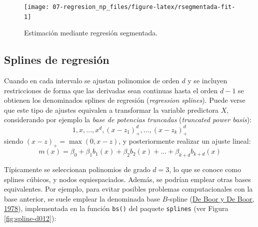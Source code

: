 \documentclass[
]{book}
\theoremstyle{break}
\theoremstyle{nonumberplain}
\begin{document}
\begin{figure}[!htb]

{\centering \texttt{[image: 07-regresion\_np\_files/figure-latex/rsegmentada-fit-1]} 

}

\caption{Estimación mediante regresión segmentada.}\label{fig:rsegmentada-fit}
\end{figure}

\hypertarget{reg-splines}{%
\subsection{Splines de regresión}\label{reg-splines}}

Cuando en cada intervalo se ajustan polinomios de orden \(d\) y se incluyen restricciones de forma que las derivadas sean continuas hasta el orden \(d-1\) se obtienen los denominados splines de regresión (\emph{regression splines}).
Puede verse que este tipo de ajustes equivalen a transformar la variable predictora \(X\), considerando por ejemplo la \emph{base de potencias truncadas} (\emph{truncated power basis}):
\[1, x, \ldots, x^d, (x-z_1)_+^d,\ldots,(x-z_k)_+^d\]
siendo \((x - z)_+ = \max(0, x - z)\), y posteriormente realizar un ajuste lineal:
\[m(x) = \beta_0 + \beta_1 b_1(x) +  \beta_2 b_2(x) + \ldots  + \beta_{k+d} b_{k+d}(x)\]

Típicamente se seleccionan polinomios de grado \(d=3\), lo que se conoce como splines cúbicos, y nodos equiespaciados.
Además, se podrían emplear otras bases equivalentes.
Por ejemplo, para evitar posibles problemas computacionales con la base anterior, se suele emplear la denominada base \(B\)-spline (\protect\hyperlink{ref-de1978practical}{De Boor y De Boor, 1978}), implementada en la función \texttt{bs()} del paquete \texttt{splines} (ver Figura \ref{fig:spline-d012}):
\end{document}
